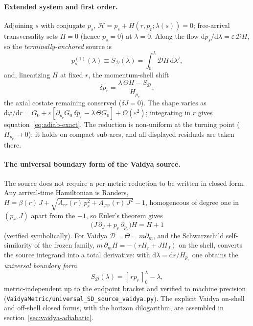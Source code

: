\documentclass[12pt]{iopart}
\newcommand{\dd}{\mathrm{d}}
\begin{document}
\paragraph{Extended system and first order.} Adjoining $s$ with conjugate $p_s$,
$\mathcal H=p_s+H(r,p_r;\lambda(s))=0$; free-arrival transversality sets $H=0$ (hence
$p_s=0$) at $\lambda=0$. Along the flow $\dd p_s/\dd\lambda=\varepsilon\,\mathcal D H$, so
the \emph{terminally-anchored} source is
\begin{equation}
    p_s^{(1)}(\lambda)\equiv S_{\mathcal D}(\lambda)
    =\int_0^{\lambda}\mathcal D H\,\dd\lambda',
    \label{eq:pS-app}
\end{equation}
and, linearizing $H$ at fixed $r$, the momentum-shell shift
\begin{equation}
    \delta p_r=\frac{\lambda\,\Theta H-S_{\mathcal D}}{H_{p_r}},
    \label{eq:dpr-app}
\end{equation}
the axial costate remaining conserved ($\delta J=0$). The shape varies as
$\dd\varphi/\dd r=G_0+\varepsilon[\partial_{p_r}G_0\,\delta p_r-\lambda\,\Theta G_0]
+O(\varepsilon^2)$; integrating in $r$ gives equation~\eqref{eq:adiab-exact}. The reduction is
non-uniform at the turning point ($H_{p_r}\to0$): it holds on compact sub-arcs, and all
displayed residuals are taken there.

\paragraph{The universal boundary form of the Vaidya source.} The source does not
require a per-metric reduction to be written in closed form. Any arrival-time
Hamiltonian is Randers, $H=\beta(r)\,J+\sqrt{A_{rr}(r)\,p_r^2+A_{\varphi\varphi}(r)\,J^2}-1$,
homogeneous of degree one in $(p_r,J)$ apart from the $-1$, so Euler's theorem gives
\begin{equation}
    \big(J\,\partial_J+p_r\,\partial_{p_r}\big)H=H+1
    \label{eq:finsler-euler}
\end{equation}
(verified symbolically). For Vaidya $\mathcal D=\Theta=m\partial_m$, and the
Schwarzschild self-similarity of the frozen family,
$m\,\partial_m H=-(r H_r+J H_J)$ on the shell, converts the source integrand into a total
derivative: with $\dd\lambda=\dd r/H_{p_r}$ one obtains the \emph{universal boundary form}
\begin{equation}
    S_{\mathcal D}(\lambda)=[\,rp_r\,]_0^{\lambda}-\lambda,
    \label{eq:SD-vaidya}
\end{equation}
metric-independent up to the endpoint bracket and verified to machine precision
(\texttt{VaidyaMetric/universal\_SD\_source\_vaidya.py}). The explicit Vaidya on-shell and off-shell closed forms,
with the horizon dilogarithm, are assembled in section~\ref{sec:vaidya-adiabatic}.
\end{document}
